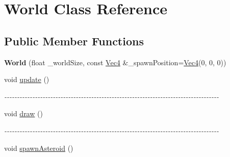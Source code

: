 \hypertarget{classWorld}{
\section{World Class Reference}
\label{classWorld}
}
\subsection*{Public Member Functions}
\begin{DoxyCompactItemize}
\item 
\hypertarget{classWorld_a2665ff6176e412dcb4bc1243c680a62b}{
{\bfseries World} (float \_\-worldSize, const \hyperlink{classVec4}{Vec4} \&\_\-spawnPosition=\hyperlink{classVec4}{Vec4}(0, 0, 0))}
\label{classWorld_a2665ff6176e412dcb4bc1243c680a62b}

\item 
\hypertarget{classWorld_aac8c1fde63c06577ffc648aaefdb37f0}{
void \hyperlink{classWorld_aac8c1fde63c06577ffc648aaefdb37f0}{update} ()}
\label{classWorld_aac8c1fde63c06577ffc648aaefdb37f0}

\begin{DoxyCompactList}\small\item\em -\/-\/-\/-\/-\/-\/-\/-\/-\/-\/-\/-\/-\/-\/-\/-\/-\/-\/-\/-\/-\/-\/-\/-\/-\/-\/-\/-\/-\/-\/-\/-\/-\/-\/-\/-\/-\/-\/-\/-\/-\/-\/-\/-\/-\/-\/-\/-\/-\/-\/-\/-\/-\/-\/-\/-\/-\/-\/-\/-\/-\/-\/-\/-\/-\/-\/-\/-\/-\/-\/-\/-\/-\/-\/-\/-\/-\/-\/-\/-\/-\/-\/-\/-\/ \item\end{DoxyCompactList}\item 
\hypertarget{classWorld_ab51a17ccbb108616daacd0c34973dc8d}{
void \hyperlink{classWorld_ab51a17ccbb108616daacd0c34973dc8d}{draw} ()}
\label{classWorld_ab51a17ccbb108616daacd0c34973dc8d}

\begin{DoxyCompactList}\small\item\em -\/-\/-\/-\/-\/-\/-\/-\/-\/-\/-\/-\/-\/-\/-\/-\/-\/-\/-\/-\/-\/-\/-\/-\/-\/-\/-\/-\/-\/-\/-\/-\/-\/-\/-\/-\/-\/-\/-\/-\/-\/-\/-\/-\/-\/-\/-\/-\/-\/-\/-\/-\/-\/-\/-\/-\/-\/-\/-\/-\/-\/-\/-\/-\/-\/-\/-\/-\/-\/-\/-\/-\/-\/-\/-\/-\/-\/-\/-\/-\/-\/-\/-\/-\/ \item\end{DoxyCompactList}\item 
\hypertarget{classWorld_ac13779cce7fefe7a065e97416edbf35b}{
void \hyperlink{classWorld_ac13779cce7fefe7a065e97416edbf35b}{spawnAsteroid} ()}
\label{classWorld_ac13779cce7fefe7a065e97416edbf35b}


\end{DoxyCompactItemize}

